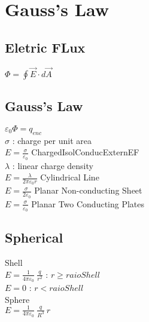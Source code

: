 \section{Gauss's Law}
\subsection{Eletric FLux}
$\Phi =\oint \vec{E}\cdot d\vec{A}$\\
\subsection{Gauss's Law}
$\varepsilon _0\Phi =q_{enc}$\\
$\sigma$ : charge per unit area\\
$E=\frac{\sigma }{\varepsilon _0}$ ChargedIsolConducExternEF\\
$\lambda$ : linear charge density\\
$E=\frac{\lambda }{2\pi \varepsilon _0r}$ Cylindrical Line\\
$E=\frac{\sigma \:}{2\varepsilon _0}$ Planar Non-conducting Sheet\\
$E=\frac{\sigma }{\varepsilon _0}$ Planar Two Conducting Plates\\
\subsection{Spherical}
Shell\\
$E=\frac{1}{4\pi \varepsilon _0}\:\frac{q}{r^2}$ : $r\ge raioShell$ \\
$E=0$ : $r < raioShell$\\
Sphere\\
$E=\frac{1}{4\pi \varepsilon _0}\:\frac{q}{R^3}\:r$\\
